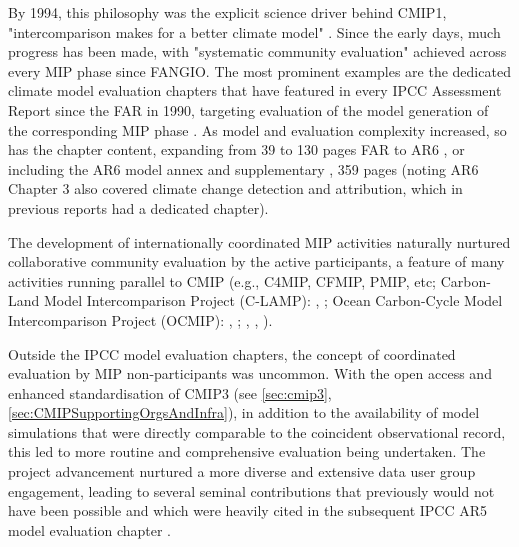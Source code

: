 \documentclass[manuscript]{copernicus}
\begin{document}
By 1994, this philosophy was the explicit science driver behind CMIP1, "intercomparison makes for a better climate model" \citep{meehl_intercomparison_1997}. Since the early days, much progress has been made, with "systematic community evaluation" achieved across every MIP phase since FANGIO. The most prominent examples are the dedicated climate model evaluation chapters that have featured in every IPCC Assessment Report since the FAR in 1990, targeting evaluation of the model generation of the corresponding MIP phase \citep[e.g.,][]{gates_validation_1990,gates_climate_1996,mcavaney_model_2001,randall_climate_2007,flato_evaluation_2013,eyring_human_2021}. As model and evaluation complexity increased, so has the chapter content, expanding from 39 to 130 pages FAR to AR6 \citep{gates_validation_1990,eyring_human_2021}, or including the AR6 model annex \citep{gutierrez_models_2021} and supplementary \citep{eyring_human_2021-1}, 359 pages (noting AR6 Chapter 3 also covered climate change detection and attribution, which in previous reports had a dedicated chapter).

The development of internationally coordinated MIP activities naturally nurtured collaborative community evaluation by the active participants, a feature of many activities running parallel to CMIP (e.g., C4MIP, CFMIP, PMIP, etc; Carbon-Land Model Intercomparison Project (C-LAMP): \citeauthor{hoffman_results_2007}, \citeyear{hoffman_results_2007}; Ocean Carbon-Cycle Model Intercomparison Project (OCMIP): \citeauthor{orr_ocean_1999}, \citeyear{orr_ocean_1999}; \citeauthor{dutay_evaluation_2002}, \citeyear{dutay_evaluation_2002}, \citeyear{dutay_evaluation_2004}).

Outside the IPCC model evaluation chapters, the concept of coordinated evaluation by MIP non-participants was uncommon. With the open access and enhanced standardisation of CMIP3 (see \autoref{sec:cmip3}, \autoref{sec:CMIPSupportingOrgsAndInfra}), in addition to the availability of model simulations that were directly comparable to the coincident observational record, this led to more routine and comprehensive evaluation being undertaken. The project advancement nurtured a more diverse and extensive data user group engagement, leading to several seminal contributions that previously would not have been possible \citep[e.g.,][]{eyring_assessment_2006,gleckler_performance_2008,waugh_quantitative_2008} and which were heavily cited in the subsequent IPCC AR5 model evaluation chapter \citep{flato_evaluation_2013}.
\end{document}
